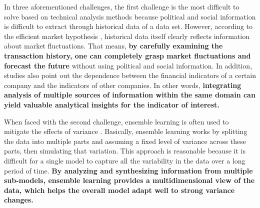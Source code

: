 In three aforementioned challenges, the first challenge is the most difficult to solve based on technical analysis methods because political and social information is difficult to extract through historical data of a data set. However, according to the efficient market hypothesis \cite{fama1970efficient}, historical data itself clearly reflects information about market fluctuations. That means, \textbf{by carefully examining the transaction history, one can completely grasp market fluctuations and forecast the future} without using political and social information. In addition, \cite{overreactioncontrarian, mech1993portfolio} studies also point out the dependence between the financial indicators of a certain company and the indicators of other companies. In other words, \textbf{integrating analysis of multiple sources of information within the same domain can yield valuable analytical insights for the indicator of interest.}


When faced with the second challenge, ensemble learning is often used to mitigate the effects of variance \cite{ali2020complete, zafeiriou2020intraday, sadeghi2021combined}. Basically, ensemble learning works by splitting the data into multiple parts and assuming a fixed level of variance across these parts, then simulating that variation. This approach is reasonable because it is difficult for a single model to capture all the variability in the data over a long period of time. \textbf{By analyzing and synthesizing information from multiple sub-models, ensemble learning provides a multidimensional view of the data, which helps the overall model adapt well to strong variance changes.}


